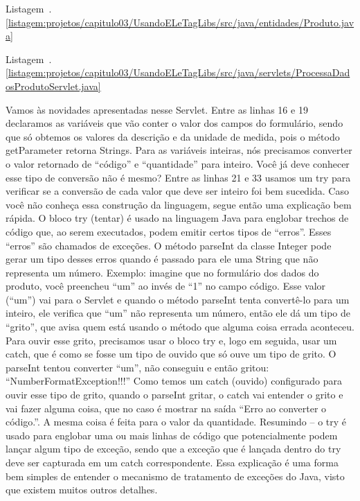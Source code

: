 Listagem~\thechapter.\ref{listagem:projetos/capitulo03/UsandoELeTagLibs/src/java/entidades/Produto.java}


Listagem~\thechapter.\ref{listagem:projetos/capitulo03/UsandoELeTagLibs/src/java/servlets/ProcessaDadosProdutoServlet.java}


Vamos às novidades apresentadas nesse Servlet. Entre as linhas 16 e 19 declaramos as variáveis que vão conter o valor dos campos do formulário, sendo que só obtemos os valores da descrição e da unidade de medida, pois o método getParameter retorna Strings.
Para as variáveis inteiras, nós precisamos converter o valor retornado de ``código'' e ``quantidade'' para inteiro. Você já deve conhecer esse tipo de conversão não é mesmo? Entre as linhas 21 e 33 usamos um try para verificar se a conversão de cada valor que deve ser inteiro foi bem sucedida. Caso você não conheça essa construção da linguagem, segue então uma explicação bem rápida. 
O bloco try (tentar) é usado na linguagem Java para englobar trechos de código que, ao serem executados, podem emitir certos tipos de ``erros''. Esses ``erros'' são chamados de exceções. O método parseInt da classe Integer pode gerar um tipo desses erros quando é passado para ele uma String que não representa um número. Exemplo: imagine que no formulário dos dados do produto, você preencheu ``um'' ao invés de ``1'' no campo código. Esse valor (``um'') vai para o Servlet e quando o método parseInt tenta convertê-lo para um inteiro, ele verifica que ``um'' não representa um número, então ele dá um tipo de ``grito'', que avisa quem está usando o método que alguma coisa errada aconteceu. Para ouvir esse grito, precisamos usar o bloco try e, logo em seguida, usar um catch, que é como se fosse um tipo de ouvido que só ouve um tipo de grito. O parseInt tentou converter ``um'', não conseguiu e então gritou: ``NumberFormatException!!!'' Como temos um catch (ouvido) configurado para ouvir esse tipo de grito, quando o parseInt gritar, o catch vai entender o grito e vai fazer alguma coisa, que no caso é mostrar na saída ``Erro ao converter o código.''. A mesma coisa é feita para o valor da quantidade. Resumindo – o try é usado para englobar uma ou mais linhas de código que potencialmente podem lançar algum tipo de exceção, sendo que a exceção que é lançada dentro do try deve ser capturada em um catch correspondente. Essa explicação é uma forma bem simples de entender o mecanismo de tratamento de exceções do Java, visto que existem muitos outros detalhes.
